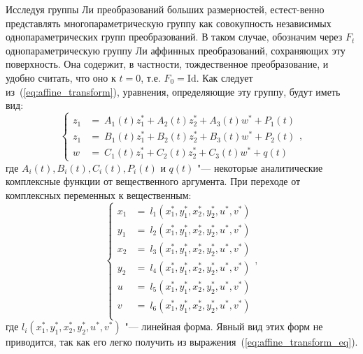 \documentclass[../main.tex]{subfiles}
\begin{document}
Исследуя группы Ли преобразований больших размерностей, {естест-}{венно} представлять многопараметрическую группу как совокупность независимых однопараметрических групп преобразований. В таком случае, обозначим через $F_t$ однопараметрическую группу Ли аффинных преобразований, сохраняющих эту поверхность. Она содержит, в частности, тождественное преобразование, и удобно считать, что оно  к $t = 0$, т.е. $F_0 = \textrm{Id}$. Как следует из~(\ref{eq:affine_transform}), уравнения, определяющие эту группу, будут иметь вид:
\begin{equation}\label{eq:affine_transform_eq}
  \begin{cases}
     z_1 &=~A_{1}(t) z_1^* + A_{2}(t) z_2^* + A_{3}(t) w^* + P_1(t) \\
     z_1 &=~B_{1}(t) z_1^* + B_{2}(t) z_2^* + B_{3}(t) w^* + P_2(t) \\
     w   &=~C_{1}(t) z_1^* + C_{2}(t) z_2^* + C_{3}(t) w^* + q(t)
  \end{cases},
\end{equation}
где $A_{i}(t), B_{i}(t), C_{i}(t), P_i(t)$ и $q(t)$ "--- некоторые аналитические комплексные функции от вещественного аргумента. При переходе от комплексных переменных к вещественным:
\begin{equation}\label{eq:coordinates_transform}
  \begin{cases}
     x_1 &=~l_1(x_1^*, y_1^*, x_2^*, y_2^*, u^*, v^*)\\
     y_1 &=~l_2(x_1^*, y_1^*, x_2^*, y_2^*, u^*, v^*)\\
     x_2 &=~l_3(x_1^*, y_1^*, x_2^*, y_2^*, u^*, v^*)\\
     y_2 &=~l_4(x_1^*, y_1^*, x_2^*, y_2^*, u^*, v^*)\\
     u   &=~l_5(x_1^*, y_1^*, x_2^*, y_2^*, u^*, v^*)\\
     v   &=~l_6(x_1^*, y_1^*, x_2^*, y_2^*, u^*, v^*)\\
  \end{cases},
\end{equation}
где $l_i(x_1^*, y_1^*, x_2^*, y_2^*, u^*, v^*)$ "--- линейная форма. Явный вид этих форм не приводится, так как его легко получить из выражения~(\ref{eq:affine_transform_eq}).
\end{document}
